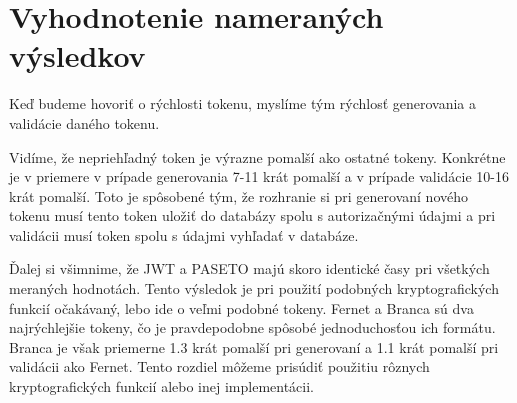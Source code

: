 \begin{table}
  \begin{center}
    \caption{Kryptografické funkcie na podpisovanie a šifrovanie tokenov}
    \label{tab:api_porovnanie} %

  \end{center}
\end{table}

\section{Vyhodnotenie nameraných výsledkov}

Keď budeme hovoriť o rýchlosti tokenu, myslíme tým rýchlosť generovania a validácie daného tokenu. 

Vidíme, že nepriehľadný token je výrazne pomalší ako ostatné tokeny. Konkrétne je v priemere v prípade generovania 7-11 krát pomalší a v prípade validácie 10-16 krát pomalší. Toto je spôsobené tým, že rozhranie si pri generovaní nového tokenu musí tento token uložiť do databázy spolu s autorizačnými údajmi a pri validácii musí token spolu s údajmi vyhľadať v databáze.

Ďalej si všimnime, že JWT a PASETO majú skoro identické časy pri všetkých meraných hodnotách. Tento výsledok je pri použití podobných kryptografických funkcií očakávaný, lebo ide o veľmi podobné tokeny. Fernet a Branca sú dva najrýchlejšie tokeny, čo je pravdepodobne spôsobé jednoduchosťou ich formátu. Branca je však priemerne 1.3 krát pomalší pri generovaní a 1.1 krát pomalší pri validácii ako Fernet. Tento rozdiel môžeme prisúdiť použitiu rôznych kryptografických funkcií alebo inej implementácii.

